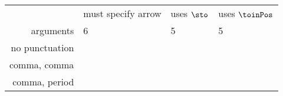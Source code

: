 \begin{widepar}
	\begin{tabular}{rlll}
		               & must specify arrow  & uses $\sto$            & uses $\toinPos$        \\
		arguments      & 6                   & 5                      & 5                      \\
		no punctuation & \str{\defmap}       & \str{\defmapset}       & \str{\defmappos}       \\
		comma, comma   & \str{\defmapcomma}  & \str{\defmapcommaset}  & \str{\defmapcommapos}  \\
		comma, period  & \str{\defmapperiod} & \str{\defmapperiodset} & \str{\defmapperiodpos} \\
	\end{tabular}
\end{widepar}


